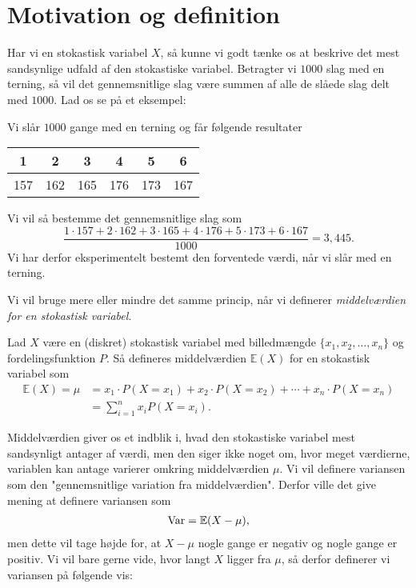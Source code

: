 
\section*{Motivation og definition}

Har vi en stokastisk variabel $X$, så kunne vi godt tænke os at beskrive det mest sandsynlige udfald af den stokastiske variabel. Betragter vi $1000$ slag med en terning, så vil det gennemsnitlige slag være summen af alle de slåede slag delt med $1000$. Lad os se på et eksempel:
\begin{exa}
Vi slår $1000$ gange med en terning og får følgende resultater
\begin{center}
\begin{tabular}{c|c|c|c|c|c}
1 & 2 & 3 & 4 & 5 & 6 \\
\hline 
157& 162& 165& 176& 173& 167
\end{tabular}
\end{center}
Vi vil så bestemme det gennemsnitlige slag som
\[
\frac{1\cdot 157 + 2\cdot 162 + 3\cdot 165 + 4 \cdot 176 + 5\cdot 173 + 6\cdot 167}{1000} = 3,445.
\]
Vi har derfor eksperimentelt bestemt den forventede værdi, når vi slår med en terning. 
\end{exa}
Vi vil bruge mere eller mindre det samme princip, når vi definerer \textit{middelværdien for en stokastisk variabel}.
\begin{defn}[Middelværdi]
Lad $X$ være en (diskret) stokastisk variabel med billedmængde $\{x_1,x_2,\hdots,x_n\}$ og fordelingsfunktion $P$. Så defineres middelværdien $\mathbb{E}(X)$ for en stokastisk variabel som
\begin{align*}
\mathbb{E}(X) = \mu &= x_1 \cdot P(X = x_1) + x_2 \cdot P(X=x_2) + \cdots + x_n \cdot P(X=x_n)\\
&= \sum_{i=1}^{n} x_i P(X=x_i).
\end{align*} 
\end{defn}
Middelværdien giver os et indblik i, hvad den stokastiske variabel mest sandsynligt antager af værdi, men den siger ikke noget om, hvor meget værdierne, variablen kan antage varierer omkring middelværdien $\mu$. Vi vil definere variansen som den "gennemsnitlige variation fra middelværdien". Derfor ville det give mening at definere variansen som 
\begin{align*}
\textnormal{Var} = \mathbb{E}(X-\mu), 
\end{align*}
men dette vil tage højde for, at $X-\mu$ nogle gange er negativ og nogle gange er positiv. Vi vil bare gerne vide, hvor langt $X$ ligger fra $\mu$, så derfor definerer vi variansen på følgende vis:
